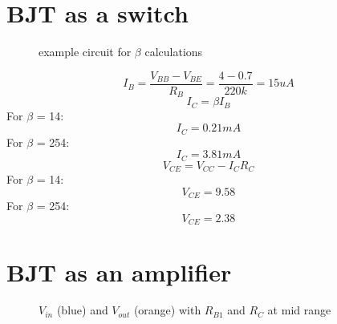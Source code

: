 \documentclass[a4paper,11pt]{article}
\begin{document}
\section{BJT as a switch}
\begin{figure}[h]
 \begin{center}
  \vspace{-8pt}
  \caption{example circuit for $\beta$ calculations}
 \end{center}
\end{figure}

$$ I_B = \dfrac{V_{BB} - V_{BE}}{R_B} = \dfrac{4-0.7}{220k} = 15uA  $$
$$ I_C = \beta I_B  $$
For $\beta$ = 14:  $$I_C = 0.21mA$$
For $\beta$ = 254:  $$I_C = 3.81mA$$
$$ V_{CE} = V_{CC} - I_C R_C $$
For $\beta$ = 14:  $$V_{CE} = 9.58$$
For $\beta$ = 254:  $$V_{CE} = 2.38$$
\pagebreak

\section{BJT as an amplifier}


\begin{figure}[h]
 \begin{center}
  \vspace{-8pt}
  \caption{$V_{in}$ (blue) and $V_{out}$ (orange) with $R_{B1}$ and $R_C$ at mid range}
 \end{center}
\end{figure}
\end{document}
